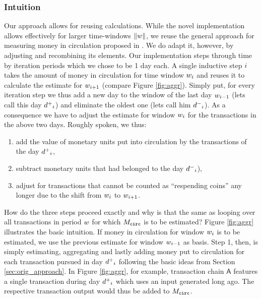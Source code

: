 \subsubsection{Intuition}
\label{sec:novel_impl_intuition}%
Our approach allows for reusing calculations. %
While the novel implementation allows effectively for larger time-windows \({\lVert w \rVert}\), we reuse the general approach for measuring money in circulation proposed in \cite{pernice2019cryptocurrencies}. %
We do adapt it, however, by adjusting and recombining its elements. %
Our implementation steps through time by iteration periods which we chose to be 1 day each. %
A single inductive step \({i}\) takes the amount of money in circulation for time window \({w}_{i}\) and reuses it to calculate the estimate for \({w}_{{i}+1}\) (compare Figure \ref{fig:aggr}). %
Simply put, for every iteration step we thus add a new day to the window of the last day \({w}_{{i}-1}\) (lets call this day \({d^{+}}_{{i}}\)) and eliminate the oldest one (lets call him \({d^{-}}_{{i}}\)). %
As a consequence we have to adjust the estimate for window \({w}_{i}\) for the transactions in the above two days. %
Roughly spoken, we thus:
\begin{enumerate}
\item add the value of monetary units put into circulation by the transactions of the day \({d^{+}}_{{i}}\), %
\item subtract monetary units that had belonged to the day \({d^{-}}_{{i}}\)), %
\item adjust for transactions that cannot be counted as ``respending coins'' any longer due to the shift from \({w}_{{i}}\) to \({w}_{{i} + 1}\). %
\end{enumerate}
How do the three steps proceed exactly and why is that the same as looping over all transactions in period \({w}\) for which \({M_{\mathtt{circ}}}\) is to be estimated? %
Figure \ref{fig:aggr} illustrates the basic intuition. %
If money in circulation for window \({w}_{{i}}\) is to be estimated, we use the previous estimate for window \({w}_{{i}-1}\) as basis. %
Step 1, then, is simply estimating, aggregating and lastly adding money put to circulation for each transaction pursued in day \({d^{+}}_{{i}}\) following the basic ideas from Section \ref{sec:orig_approach}. %
In Figure \ref{fig:aggr}, for example, transaction chain \(\mathsf{A}\) features a single transaction during day \({d^{+}}_{{i}}\) which uses an input generated long ago. The respective transaction output would thus be added to \({M_{\mathtt{circ}}}\).
